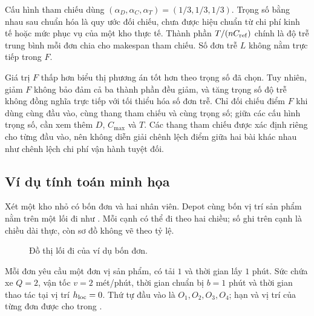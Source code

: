Cấu hình tham chiếu dùng $(\alpha_D,\alpha_C,\alpha_T)=(1/3,1/3,1/3)$. Trọng số bằng nhau sau chuẩn hóa là quy ước đối chiếu, chưa được hiệu chuẩn từ chi phí kinh tế hoặc mức phục vụ của một kho thực tế. Thành phần $T/(nC_{\rm ref})$ chính là độ trễ trung bình mỗi đơn chia cho makespan tham chiếu. Số đơn trễ $L$ không nằm trực tiếp trong $F$.

Giá trị $F$ thấp hơn biểu thị phương án tốt hơn theo trọng số đã chọn. Tuy nhiên, giảm $F$ không bảo đảm cả ba thành phần đều giảm, và tăng trọng số độ trễ không đồng nghĩa trực tiếp với tối thiểu hóa số đơn trễ. Chỉ đối chiếu điểm $F$ khi dùng cùng đầu vào, cùng thang tham chiếu và cùng trọng số; giữa các cấu hình trọng số, cần xem thêm $D$, $C_{\max}$ và $T$. Các thang tham chiếu được xác định riêng cho từng đầu vào, nên không diễn giải chênh lệch điểm giữa hai bài khác nhau như chênh lệch chi phí vận hành tuyệt đối.

\subsection{Ví dụ tính toán minh họa}

Xét một kho nhỏ có bốn đơn và hai nhân viên. Depot cùng bốn vị trí sản phẩm nằm trên một lối đi như . Mỗi cạnh có thể đi theo hai chiều; số ghi trên cạnh là chiều dài thực, còn sơ đồ không vẽ theo tỷ lệ.

\begin{figure}[H]
\centering
{}
\caption{Đồ thị lối đi của ví dụ bốn đơn.}\label{fig:model-example}
\end{figure}

Mỗi đơn yêu cầu một đơn vị sản phẩm, có tải $1$ và thời gian lấy $1$ phút. Sức chứa xe $Q=2$, vận tốc $v=2$ mét/phút, thời gian chuẩn bị $b=1$ phút và thời gian thao tác tại vị trí $h_{\rm loc}=0$. Thứ tự đầu vào là $O_1,O_2,O_3,O_4$; hạn và vị trí của từng đơn được cho trong .

